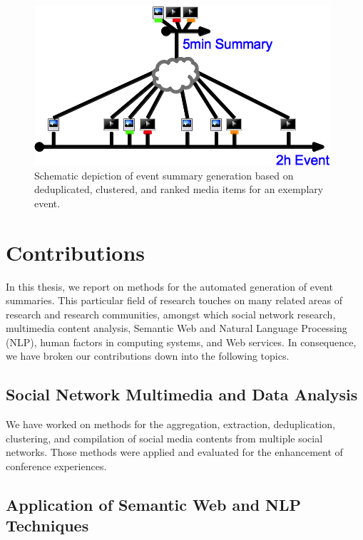 \begin{figure}[!ht]
  \centering
  \includegraphics[]{thesis-diagram.png}
  \caption[Schematic depiction of event summary generation]
    {Schematic depiction of event summary generation
    based on deduplicated, clustered, and ranked media items
    for an exemplary event.}
  \label{fig:thesis-diagram}
\end{figure}

\section{Contributions}

In this thesis, we report on methods for
the automated generation of event summaries.
This particular field of research touches on many related areas
of research and research communities,
amongst which social network research, multimedia content analysis,
Semantic Web and Natural Language Processing (NLP),
human factors in computing systems,
and Web services.
In consequence, we have broken our contributions down into
the following topics.

\subsection{Social Network Multimedia and Data Analysis}

We have worked on methods for the aggregation, extraction,
deduplication, clustering, and compilation
of social media contents from
multiple social networks.
Those methods were applied and evaluated
for the enhancement of conference experiences.

\subsection{Application of Semantic Web and NLP Techniques}

